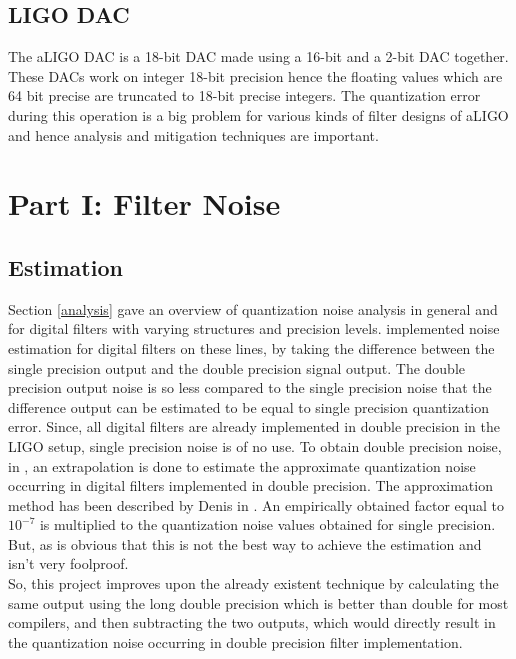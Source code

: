 \documentclass[colorlinks=true,pdfstartview=FitV,linkcolor=blue,
            citecolor=red,urlcolor=magenta]{ligodoc}
\begin{document}
	\subsection{LIGO DAC}
	The aLIGO DAC is a 18-bit DAC made using a 16-bit and a 2-bit DAC together. These DACs work on integer 18-bit precision hence the floating values which are 64 bit precise are truncated to 18-bit precise integers. The quantization error during this operation is a big problem for various kinds of filter designs of aLIGO and hence analysis and mitigation techniques are important. 

\section{Part I: Filter Noise}
\label{filter}
	\subsection{Estimation}
	\label{est}
Section \ref{analysis} gave an overview of quantization noise analysis in general and for digital filters with varying structures and precision levels. 
\cite{Martynov} implemented noise estimation for digital filters on these lines, by taking the difference between the single precision output and the double precision signal output. The double precision output noise is so less compared to the single precision noise that the difference output can be estimated to be equal to single precision quantization error.  Since, all digital filters are already implemented in double precision in the LIGO setup, single precision noise is of no use. To obtain double precision noise, in \cite{Martynov}, an extrapolation is done to estimate the approximate quantization noise occurring in digital filters implemented in double precision. The approximation method has been described by Denis in \cite{Martynov2}. An empirically obtained factor equal to $10^{-7}$ is multiplied to the quantization noise values obtained for single precision. But, as is obvious that this is not the best way to achieve the estimation and isn't very foolproof.\\
 So, this project improves upon the already existent technique by calculating the same output using the long double precision which is better than double for most \cite{longdouble} compilers, and then subtracting the two outputs, which would directly result in the quantization noise occurring in double precision filter implementation. 
		
\end{document}
